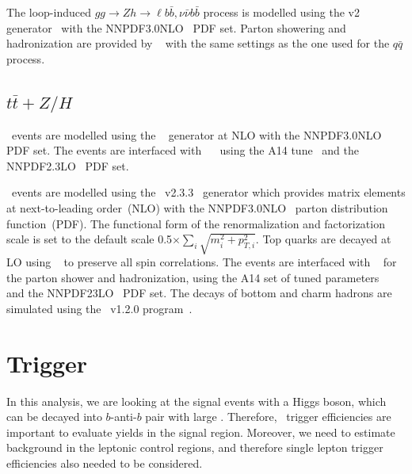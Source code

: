 \par The loop-induced $gg\to Zh \to \ell b\bar{b}, \nu\bar{\nu}b\bar{b}$ process is modelled using the \powhegbox v2 generator~\cite{Alioli:2010xd} with the NNPDF3.0NLO~\cite{Ball:2014uwa} PDF set.
Parton showering and hadronization are provided by \pythia~\cite{Sjostrand:2014zea} with the same settings as the one used for the $q\bar{q}$ process.

\subsection{$t\bar{t}+Z/H$}

\par \ttH~events are modelled using the \powhegbox~\cite{Frixione:2007nw,Nason:2004rx,Frixione:2007vw,Alioli:2010xd,Hartanto:2015uka}
generator at NLO with the NNPDF3.0NLO~\cite{Ball:2014uwa} PDF set.
The events are interfaced with \pythia~\cite{Sjostrand:2014zea}~ using the A14 tune~\cite{ATL-PHYS-PUB-2014-021} and the NNPDF2.3LO~\cite{Ball:2014uwa} PDF set.

\par \ttV~events are modelled using the \mgamc~v2.3.3~\cite{Alwall:2014hca} generator which provides matrix elements at next-to-leading order~(NLO) with the NNPDF3.0NLO~\cite{Ball:2014uwa} parton distribution function~(PDF).
The functional form of the renormalization and factorization scale is set to the default scale 0.5$\times \sum_i \sqrt{m^2_i+p^2_{T,i}}$.
Top quarks are decayed at LO using \madspin~\cite{Frixione:2007zp,Artoisenet:2012st} to preserve all spin correlations.
The events are interfaced with \pythia~\cite{Sjostrand:2014zea} for the parton shower and hadronization,
using the A14 set of tuned parameters~\cite{ATL-PHYS-PUB-2014-021}  and the NNPDF23LO~\cite{Ball:2014uwa} PDF set.
The decays of bottom and charm hadrons are simulated using the \evtgen\ v1.2.0 program~\cite{EvtGen}.

\section{Trigger}
\label{sec:trigger}

\par In this analysis, we are looking at the signal events with a Higgs boson, which can be decayed into $b$-anti-$b$ pair with large \met. 
Therefore, \met~trigger efficiencies are important to evaluate yields in the signal region. 
Moreover, we need to estimate background in the leptonic control regions, and therefore single lepton trigger efficiencies also needed to be considered.

